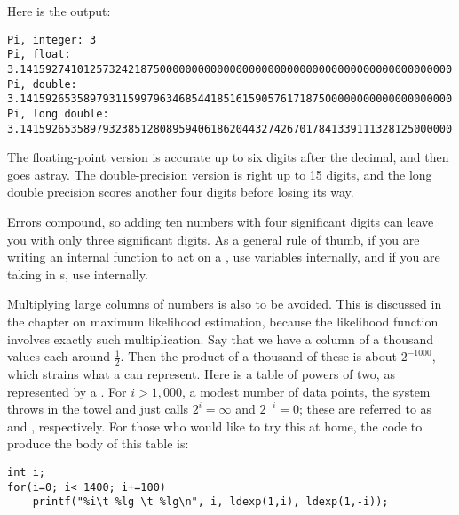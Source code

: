 
Here is the output:
\begin{lstlisting}[language={}]
Pi, integer: 3
Pi, float:  3.14159274101257324218750000000000000000000000000000000000000000000000
Pi, double:      3.14159265358979311599796346854418516159057617187500000000000000000000
Pi, long double: 3.14159265358979323851280895940618620443274267017841339111328125000000
\end{lstlisting}
The floating-point version is accurate up to six digits after the
decimal, and then goes astray. The double-precision version is right up to 15
digits, and the long double precision scores another four digits before
losing its way.

Errors compound, so adding ten numbers
with four significant digits can leave you with only three significant
digits. As a general rule of thumb, if you are writing an internal
function to act on a , use  variables internally,
and if you are taking in s, use  internally.

\label{precisionproblem}
Multiplying large columns of numbers is also to be avoided. This is
discussed in the chapter on maximum likelihood estimation, because the
likelihood function involves exactly such multiplication. Say that we
have a column of a thousand values each around $\frac{1}{2}$. Then the
product of a thousand of these is about $2^{-1000}$, which strains what
a  can represent. Here is a table of powers of two, as
represented by a . For $i>1,000$, a
modest number of data points, the system throws in the towel and just
calls $2^i = \infty$ and $2^{-i} = 0$; these are referred to as
 and , respectively. For those who would like
to try this at home, the code to produce the body of this table is:
\begin{lstlisting}
int i;
for(i=0; i< 1400; i+=100)
    printf("%i\t %lg \t %lg\n", i, ldexp(1,i), ldexp(1,-i));
\end{lstlisting}


